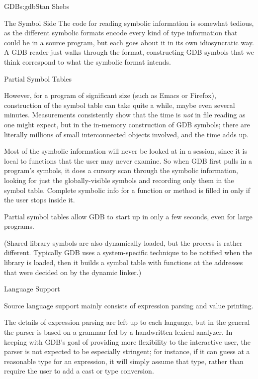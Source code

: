 \begin{aosachapter}{GDB}{s:gdb}{Stan Shebs}
\begin{aosasect1}{The Symbol Side}
The code for reading symbolic information is somewhat tedious, as the
different symbolic formats encode every kind of type information that
could be in a source program, but each goes about it in its own
idiosyncratic way.  A GDB reader just walks through the format,
constructing GDB symbols that we think correspond to what the symbolic
format intends.

\end{aosasect1}

\begin{aosasect2}{Partial Symbol Tables}

However, for a program of significant size (such as Emacs or Firefox),
construction of the symbol table can take quite a while, maybe even
several minutes.  Measurements consistently show that the time is
{\em not} in file reading as one might expect, but in the in-memory
construction of GDB symbols; there are literally millions of small
interconnected objects involved, and the time adds up.

Most of the symbolic information will never be looked at in a session,
since it is local to functions that the user may never examine.  So
when GDB first pulls in a program's symbols, it does a cursory scan
through the symbolic information, looking for just the
globally-visible symbols and recording only them in the symbol table.
Complete symbolic info for a function or method is filled in only if
the user stops inside it.

Partial symbol tables allow GDB to start up in only a few seconds, even
for large programs.

(Shared library symbols are also dynamically loaded, but the process
is rather different.  Typically GDB uses a system-specific technique
to be notified when the library is loaded, then it builds a symbol
table with functions at the addresses that were decided on by the
dynamic linker.)

\end{aosasect2}

\begin{aosasect2}{Language Support}

Source language support mainly consists of expression parsing and value
printing.

The details of expression parsing are left up to each language, but in
the general the parser is based on a  grammar fed by a
handwritten lexical analyzer.  In keeping with GDB's goal of providing
more flexibility to the interactive user, the parser is not expected
to be especially stringent; for instance, if it can guess at a
reasonable type for an expression, it will simply assume that type,
rather than require the user to add a cast or type conversion.


\end{aosasect2}
\end{aosachapter}
